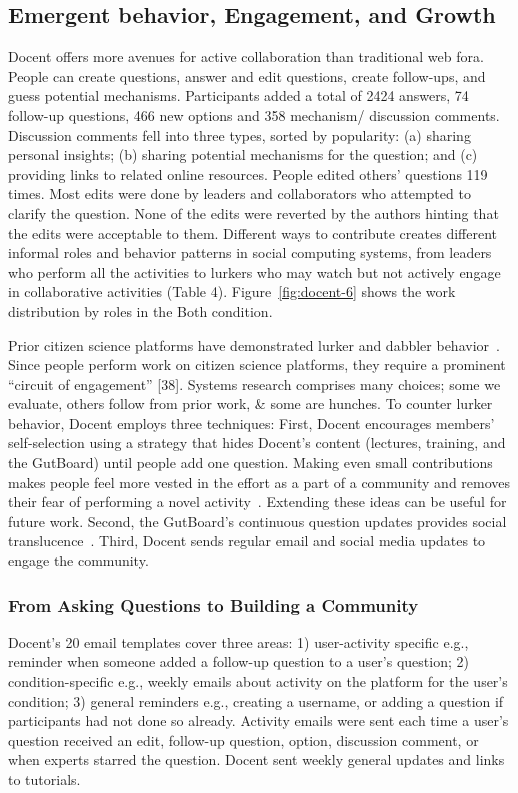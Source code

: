 \subsection{Emergent behavior, Engagement, and Growth}
Docent offers more avenues for active collaboration than traditional web fora. People can create questions, answer and edit questions, create follow-ups, and guess potential mechanisms. Participants added a total of 2424 answers, 74 follow-up questions, 466 new options and 358 mechanism/ discussion comments. Discussion comments fell into three types, sorted by popularity: (a) sharing personal insights; (b) sharing potential mechanisms for the question; and (c) providing links to related online resources. People edited others’ questions 119 times. Most edits were done by leaders and collaborators who attempted to clarify the question. None of the edits were reverted by the authors hinting that the edits were acceptable to them. Different ways to contribute creates different informal roles and behavior patterns in social computing systems, from leaders who perform all the activities to lurkers who may watch but not actively engage in collaborative activities (Table 4). Figure~\ref{fig:docent-6} shows the work distribution by roles in the Both condition.

Prior citizen science platforms have demonstrated lurker and dabbler behavior~\cite{Eveleigh2014}. Since people perform work on citizen science platforms, they require a prominent “circuit of engagement” [38]. Systems research comprises many choices; some we evaluate, others follow from prior work, \& some are hunches. To counter lurker behavior, Docent employs three techniques: First, Docent encourages members’ self-selection using a strategy that hides Docent’s content (lectures, training, and the GutBoard) until people add one question. Making even small contributions makes people feel more vested in the effort as a part of a community and removes their fear of performing a novel activity~\cite{Resnick2011}. Extending these ideas can be useful for future work. Second, the GutBoard’s continuous question updates provides social translucence~\cite{Resnick2011}. Third, Docent sends regular email and social media updates to engage the community.

\subsubsection{From Asking Questions to Building a Community}
Docent’s 20 email templates cover three areas: 1) user-activity specific e.g., reminder when someone added a follow-up question to a user’s question; 2) condition-specific e.g., weekly emails about activity on the platform for the user’s condition; 3) general reminders e.g., creating a username, or adding a question if participants had not done so already. Activity emails were sent each time a user’s question received an edit, follow-up question, option, discussion comment, or when experts starred the question. Docent sent weekly general updates and links to tutorials.
 
